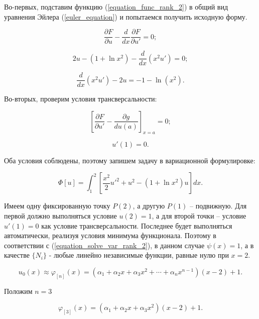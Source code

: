\documentclass{article}
\begin{document}
Во-первых, подставим функцию (\ref{equation_func_rank_2}) в общий вид уравнения Эйлера (\ref{euler_equation}) и попытаемся получить исходную форму.

\begin{displaymath}
	\frac{\partial F}{\partial u} - \frac{d}{dx}\frac{\partial F}{\partial u'} = 0;
\end{displaymath}

\begin{displaymath}
	2u - (1 + \ln{x^2}) - \frac{d}{dx}(x^2 u') = 0;
\end{displaymath}

\begin{displaymath}
	\frac{d}{dx}(x^2 u') - 2u = -1 - \ln(x^2).
\end{displaymath}

\noindent Во-вторых, проверим условия трансверсальности:

\begin{displaymath}
	\left[ \frac{\partial F}{\partial u'} - \frac{\partial g}{du(a)} \right]_{x=a} = 0;
\end{displaymath}

\begin{displaymath}
	u'(1) = 0.
\end{displaymath}

\noindent Оба условия соблюдены, поэтому запишем задачу в вариационной формулировке:

\begin{equation}\label{equation_functional_rank_2}
	\Phi[u] = \int_{1}^{2} \left[ \frac{x^2}{2}u'^2 + u^2 - (1 + \ln{x^2})u \right] dx.
\end{equation}

Имеем одну фиксированную точку $P(2)$, а другую $P(1)$ – подвижную. Для первой должно выполняться условие $u(2)=1$, а для второй точки – условие $u'(1)=0$ как условие трансверсальности. Последнее будет выполняться автоматически, реализуя условия минимума функционала. Поэтому в соответствии с (\ref{equation_solve_var_rank_2}), в данном случае $\psi(x) = 1$, а в качестве $\lbrace N_{i} \rbrace$ - любые линейно независимые функции, равные нулю при $x=2$.

\begin{displaymath}
	u_{0}(x) \approx \varphi_{[n]}(x) = (\alpha_{1} + \alpha_{2}x + \alpha_{3}x^2 + \cdots + \alpha_{n}x^{n-1})(x-2)+1.
\end{displaymath}

\noindent Положим $n = 3$

\begin{displaymath}
	\varphi_{[3]}(x) = (\alpha_{1} + \alpha_{2}x + \alpha_{3}x^2)(x-2)+1.
\end{displaymath}
\end{document}
